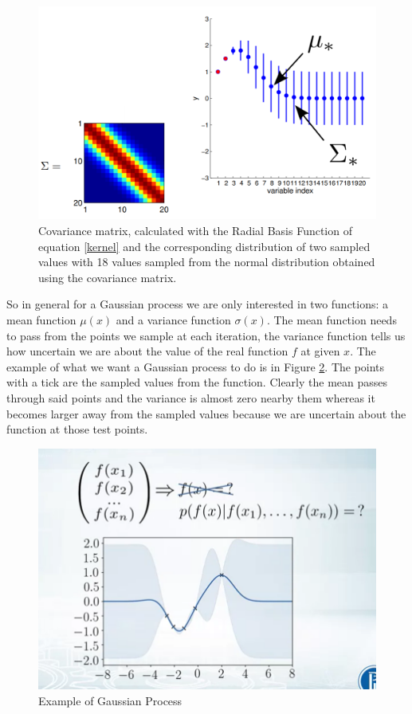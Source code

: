\documentclass{article}
\begin{document}
\begin{figure}
    \centering
    \includegraphics[width = .7\linewidth]{visualize2.png}
    \caption{Covariance matrix, calculated with the Radial Basis Function of equation \eqref{kernel} and the corresponding distribution of two sampled values with 18 values sampled from the normal distribution obtained using the covariance matrix.}
    \label{visual2}
\end{figure}

So in general for a Gaussian process we are only interested in two functions: a mean function $\mu(x)$ and a variance function $\sigma(x)$.
The mean function needs to pass from the points we sample at each iteration, the variance function tells us how uncertain we are about the value of the real function $f$ at given $x$. The example of what we want a Gaussian process to do is in Figure \ref{gp}. The points with a tick are the sampled values from the function. Clearly the mean passes through said points and the variance is almost zero nearby them whereas it becomes larger away from the sampled values because we are uncertain about the function at those test points. 

\begin{figure}
    \centering
    \includegraphics[width = .7\linewidth]{GPforML.png}
    \caption{Example of Gaussian Process}
    \label{gp}
\end{figure}
\end{document}
